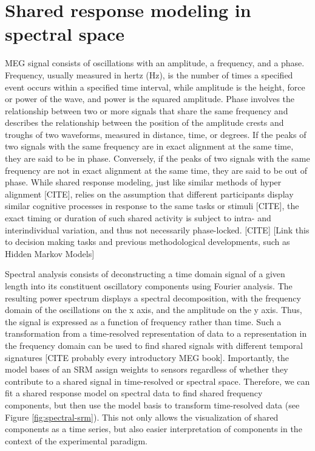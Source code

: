 \section{Shared response modeling in spectral space}

MEG signal consists of oscillations with an amplitude, a frequency, and a phase.
Frequency, usually measured in hertz (Hz), is the number of times a specified event occurs within a specified time interval, while amplitude is the height, force or power of the wave, and power is the squared amplitude.
Phase involves the relationship between two or more signals that share the same frequency and describes the relationship between the position of the amplitude crests and troughs of two waveforms, measured in distance, time, or degrees.
If the peaks of two signals with the same frequency are in exact alignment at the same time, they are said to be in phase.
Conversely, if the peaks of two signals with the same frequency are not in exact alignment at the same time, they are said to be out of phase.
While shared response modeling, just like similar methods of hyper alignment [CITE], relies on the assumption that different participants display similar cognitive processes in response to the same tasks or stimuli [CITE], the exact timing or duration of such shared activity is subject to intra- and interindividual variation, and thus not necessarily phase-locked. [CITE]
[Link this to decision making tasks and previous methodological developments, such as Hidden Markov Models]

Spectral analysis consists of deconstructing a time domain signal of a given length into its constituent oscillatory components using Fourier analysis.
The resulting power spectrum displays a spectral decomposition, with the frequency domain of the oscillations on the x axis, and the amplitude on the y axis.
Thus, the signal is expressed as a function of frequency rather than time.
Such a transformation from a time-resolved representation of data to a representation in the frequency domain can be used to find shared signals with different temporal signatures [CITE probably every introductory MEG book].
Importantly, the model bases of an \gls{SRM} assign weights to sensors regardless of whether they contribute to a shared signal in time-resolved or spectral space.
Therefore, we can fit a shared response model on spectral data to find shared frequency components, but then use the model basis to transform time-resolved data (see Figure \ref{fig:spectral-srm}).
This not only allows the visualization of shared components as a time series, but also easier interpretation of components in the context of the experimental paradigm.


